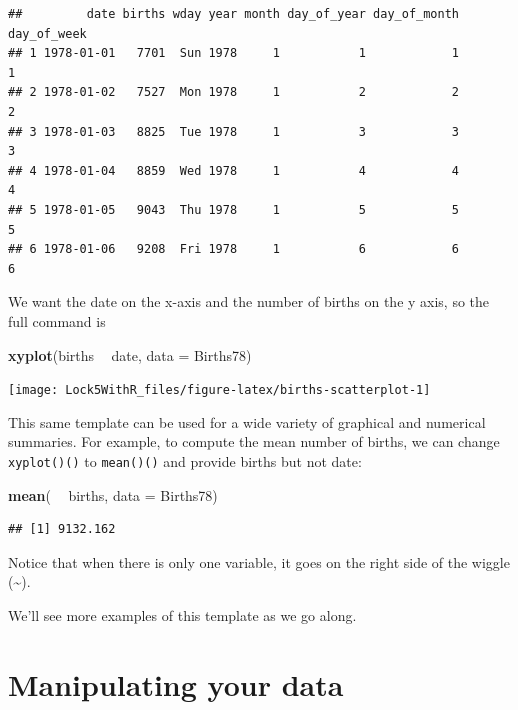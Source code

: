 \documentclass[]{book}
\newenvironment{Shaded}{\begin{snugshade}}{\end{snugshade}}
\newcommand{\DataTypeTok}[1]{\textcolor[rgb]{0.13,0.29,0.53}{#1}}
\newcommand{\KeywordTok}[1]{\textcolor[rgb]{0.13,0.29,0.53}{\textbf{#1}}}
\newcommand{\NormalTok}[1]{#1}
\newcommand{\OperatorTok}[1]{\textcolor[rgb]{0.81,0.36,0.00}{\textbf{#1}}}
\newcommand{\StringTok}[1]{\textcolor[rgb]{0.31,0.60,0.02}{#1}}
\begin{document}
\begin{verbatim}
##         date births wday year month day_of_year day_of_month day_of_week
## 1 1978-01-01   7701  Sun 1978     1           1            1           1
## 2 1978-01-02   7527  Mon 1978     1           2            2           2
## 3 1978-01-03   8825  Tue 1978     1           3            3           3
## 4 1978-01-04   8859  Wed 1978     1           4            4           4
## 5 1978-01-05   9043  Thu 1978     1           5            5           5
## 6 1978-01-06   9208  Fri 1978     1           6            6           6
\end{verbatim}

We want the date on the x-axis and the number of births on the y axis, so
the full command is

\begin{Shaded}
\begin{Highlighting}[]
\KeywordTok{xyplot}\NormalTok{(births }\OperatorTok{~}\StringTok{ }\NormalTok{date, }\DataTypeTok{data =}\NormalTok{ Births78)}
\end{Highlighting}
\end{Shaded}

\texttt{[image: Lock5WithR\_files/figure-latex/births-scatterplot-1]}

This same template can be used for a wide variety of graphical and
numerical summaries. For example, to compute the mean number of births, we can
change \texttt{xyplot()()} to \texttt{mean()()} and provide {births}
but not {date}:

\begin{Shaded}
\begin{Highlighting}[]
\KeywordTok{mean}\NormalTok{( }\OperatorTok{~}\StringTok{ }\NormalTok{births, }\DataTypeTok{data =}\NormalTok{ Births78)}
\end{Highlighting}
\end{Shaded}

\begin{verbatim}
## [1] 9132.162
\end{verbatim}

Notice that when there is only one variable, it goes on the right side of the
wiggle (\textasciitilde).

We'll see more examples of this template as we go along.

\hypertarget{manipulating-your-data}{%
\section{Manipulating your data}\label{manipulating-your-data}}
\end{document}
